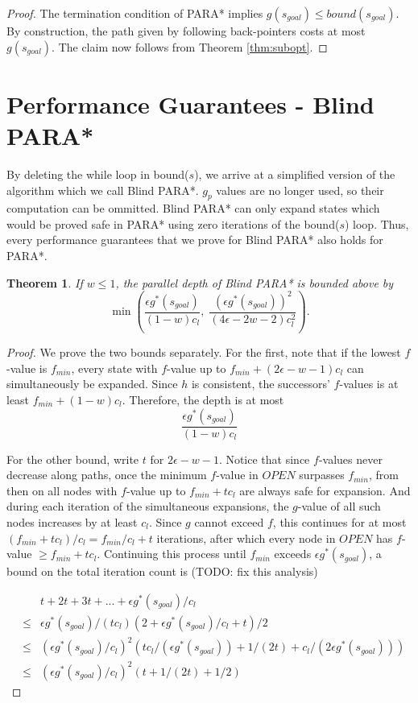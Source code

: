 \documentclass[letterpaper]{article}
\newtheorem{thm}{Theorem}
\begin{document}
\begin{proof}
The termination condition of PARA* implies $g(s_{goal}) \le bound(s_{goal})$. By construction, the path given by following back-pointers costs at most $g(s_{goal})$. The claim now follows from Theorem \ref{thm:subopt}.
\end{proof}

\section{Performance Guarantees - Blind PARA*}

By deleting the while loop in bound($s$), we arrive at a simplified version of the algorithm which we call Blind PARA*. $g_p$ values are no longer used, so their computation can be ommitted. Blind PARA* can only expand states which would be proved safe in PARA* using zero iterations of the bound($s$) loop. Thus, every performance guarantees that we prove for Blind PARA* also holds for PARA*. 

\begin{thm}
\label{thm:depth}
If $w \le 1$, the parallel depth of Blind PARA* is bounded above by
\[\min\left(\frac{\epsilon g^*(s_{goal})}{(1-w)c_l},\;
\frac{\left(\epsilon g^*(s_{goal})\right)^2 }{(4\epsilon-2w-2)c_l^2}\right).\]
\end{thm}

\begin{proof}
We prove the two bounds separately. For the first, note that if the lowest $f$-value is $f_{min}$, every state with $f$-value up to $f_{min} + (2\epsilon-w-1)c_l$ can simultaneously be expanded. Since $h$ is consistent, the successors' $f$-values is at least $f_{min} + (1-w)c_l$. Therefore, the depth is at most
\[\frac{\epsilon g^*(s_{goal})}{(1-w)c_l}\]

For the other bound, write $t$ for $2\epsilon-w-1$. Notice that since $f$-values never decrease along paths, once the minimum $f$-value in $OPEN$ surpasses $f_{min}$, from then on all nodes with $f$-value up to $f_{min} + tc_l$ are always safe for expansion. And during each iteration of the simultaneous expansions, the $g$-value of all such nodes increases by at least $c_l$. Since $g$ cannot exceed $f$, this continues for at most $(f_{min} + tc_l) / c_l = f_{min}/c_l + t$ iterations, after which every node in $OPEN$ has $f$-value $\ge f_{min} + tc_l$. Continuing this process until $f_{min}$ exceeds $\epsilon g^*(s_{goal})$, a bound on the total iteration count is (TODO: fix this analysis)

\begin{eqnarray*}
&&t + 2t + 3t + ... + \epsilon g^*(s_{goal})/c_l
\\&\le& \epsilon  g^*(s_{goal})/(tc_l)(2+\epsilon g^*(s_{goal})/c_l+t)/2
\\&\le& (\epsilon g^*(s_{goal})/c_l )^2 (tc_l/(\epsilon g^*(s_{goal})) + 1/(2t) + c_l/(2\epsilon g^*(s_{goal})))
\\&\le& (\epsilon g^*(s_{goal})/c_l )^2 (t + 1/(2t) + 1/2)
\end{eqnarray*}
\end{proof}
\end{document}
